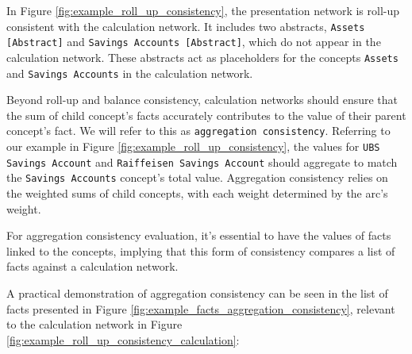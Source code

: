 
In Figure \ref{fig:example_roll_up_consistency}, the presentation network is roll-up consistent with the calculation network.  
It includes two abstracts, \texttt{Assets [Abstract]} and \texttt{Savings Accounts [Abstract]}, which do not appear in the calculation network.  
These abstracts act as placeholders for the concepts \texttt{Assets} and \texttt{Savings Accounts} in the calculation network.

Beyond roll-up and balance consistency, calculation networks should ensure that the sum of child concept's facts accurately contributes to the value of their parent concept's fact.
We will refer to this as \texttt{aggregation consistency}.
Referring to our example in Figure \ref{fig:example_roll_up_consistency},  
the values for \texttt{UBS Savings Account} and \texttt{Raiffeisen Savings Account} should aggregate to match the \texttt{Savings Accounts} concept's total value.  
Aggregation consistency relies on the weighted sums of child concepts, with each weight determined by the arc's weight.

For aggregation consistency evaluation, it's essential to have the values of facts linked to the concepts,  
implying that this form of consistency compares a list of facts against a calculation network.

A practical demonstration of aggregation consistency can be seen in the list of facts presented in Figure \ref{fig:example_facts_aggregation_consistency}, 
relevant to the calculation network in Figure \ref{fig:example_roll_up_consistency_calculation}:

